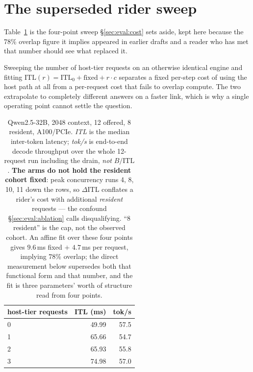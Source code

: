 
\section{The superseded rider sweep}
\label{app:ridercost}

Table~\ref{tab:ridercost} is the four-point sweep \S\ref{sec:eval:cost} sets
aside, kept here because the 78\% overlap figure it implies appeared in earlier
drafts and a reader who has met that number should see what replaced it.

Sweeping the number of host-tier requests on an otherwise identical engine and
fitting
$\mathrm{ITL}(r) = \mathrm{ITL}_0 + \text{fixed} + r\cdot c$
separates a fixed per-step cost of using the host path at all from a per-request
cost that fails to overlap compute. The two extrapolate to completely different
answers on a faster link, which is why a single operating point cannot settle
the question.

\begin{table}[t]
\centering
\small
\begin{tabular}{lrr}
\toprule
host-tier requests & ITL (ms) & tok/s \\
\midrule
0 & 49.99 & 57.5 \\
1 & 65.66 & 54.7 \\
2 & 65.93 & 55.8 \\
3 & 74.98 & 57.0 \\
\bottomrule
\end{tabular}
\caption{Qwen2.5-32B, 2048 context, 12 offered, 8 resident, A100/PCIe.
\emph{ITL} is the median inter-token latency; \emph{tok/s} is end-to-end decode
throughput over the whole 12-request run including the drain, \emph{not}
$B/\mathrm{ITL}$. \textbf{The arms do not hold the resident cohort fixed}: peak
concurrency runs 4, 8, 10, 11 down the rows, so $\Delta$ITL conflates a rider's
cost with additional \emph{resident} requests --- the confound
\S\ref{sec:eval:ablation} calls disqualifying. ``8 resident'' is the cap, not
the observed cohort. An affine fit over these four points gives $9.6$\,ms fixed
$+$ $4.7$\,ms per request, implying $78\%$ overlap; the direct measurement below
supersedes both that functional form and that number, and the fit is three
parameters' worth of structure read from four points.}
\label{tab:ridercost}
\end{table}

